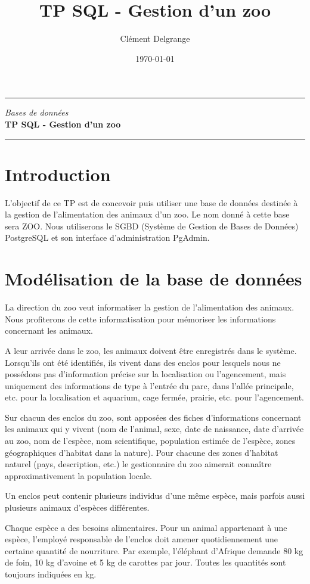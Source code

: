 \documentclass[11pt]{article}
\title{TP SQL - Gestion d'un zoo}
\author{Clément Delgrange}
\date{\today}
\begin{document}
\parindent=0cm

\begin{center}
	\hrule
	\vspace{1em}
	{\small \textit{Bases de données}}\\	
	\vspace{0.5em}
	{\Large \bfseries{TP SQL - Gestion d'un zoo}}
	\vspace{1em}
	\hrule
\end{center}
	
	
\section*{Introduction}
\label{sec:Introduction}
L'objectif de ce TP est de concevoir puis utiliser une base de données destinée à la gestion de l'alimentation des animaux d'un zoo. Le nom donné à cette base sera ZOO. Nous utiliserons le SGBD (Système de Gestion de Bases de Données) PostgreSQL et son interface d'administration PgAdmin.
	

\section{Modélisation de la base de données}
La direction du zoo veut informatiser la gestion de l'alimentation des animaux. Nous profiterons de cette informatisation pour mémoriser les informations concernant les animaux.

A leur arrivée dans le zoo, les animaux doivent être enregistrés dans le système. Lorsqu'ils ont été identifiés, ils vivent dans des enclos pour lesquels nous ne possédons pas d'information précise sur la localisation ou l'agencement, mais uniquement des informations de type à l'entrée du parc, dans l'allée principale, etc. pour la localisation et aquarium, cage fermée, prairie, etc. pour l'agencement.

Sur chacun des enclos du zoo, sont apposées des fiches d'informations concernant les animaux qui y vivent (nom de l'animal, sexe, date de naissance, date d'arrivée au zoo, nom de l'espèce, nom scientifique, population estimée de l'espèce, zones géographiques d'habitat dans la nature). Pour chacune des zones d'habitat naturel (pays, description, etc.) le gestionnaire du zoo aimerait connaître approximativement la population locale.

Un enclos peut contenir plusieurs individus d'une même espèce, mais parfois aussi plusieurs animaux d'espèces différentes.

Chaque espèce a des besoins alimentaires. Pour un animal appartenant à une espèce, l'employé responsable de l'enclos doit amener quotidiennement une certaine quantité de nourriture. Par exemple, l'éléphant d'Afrique demande 80 kg de foin, 10 kg d'avoine et 5 kg de carottes par jour. Toutes les quantités sont toujours indiquées en kg.
\end{document}
